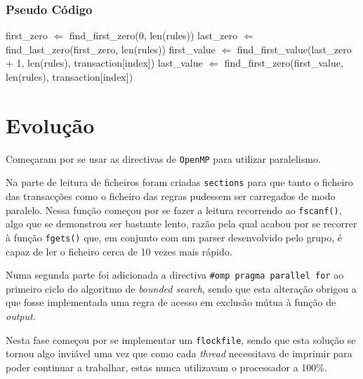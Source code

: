 \documentclass[a4paper]{article}
\begin{document}
\subsubsection{Pseudo Código}
\begin{algorithm}
	\begin{algorithmic}

				\ENDIF

				\STATE first\_zero $\Leftarrow$ find\_first\_zero(0, len(rules))
				\STATE last\_zero $\Leftarrow$ find\_last\_zero(first\_zero, len(rules))
				\STATE first\_value $\Leftarrow$ find\_first\_value(last\_zero + 1, len(rules), transaction[index])
				\STATE last\_value $\Leftarrow$ find\_first\_zero(first\_value, len(rules), transaction[index])

				\ENDIF
				\ENDIF
			\ENDFOR
		\ENDFOR
	\end{algorithmic}
\end{algorithm}
\clearpage

\section{Evolução}
\indent \indent Começaram por se usar as directivas de \texttt{OpenMP} para utilizar paralelismo. 

Na parte de leitura de ficheiros foram criadas \texttt{sections} para que tanto o ficheiro das transacções como o ficheiro das regras pudessem ser carregados de modo paralelo. Nessa função começou por se fazer a leitura recorrendo ao \texttt{fscanf()}, algo que se demonstrou ser bastante lento, razão pela qual acabou por se recorrer à função \texttt{fgets()} que, em conjunto com um parser desenvolvido pelo grupo, é capaz de ler o ficheiro cerca de 10 vezes mais rápido.

Numa segunda parte foi adicionada a directiva \texttt{\#omp pragma parallel for} ao primeiro ciclo do algoritmo de \textit{bounded search}, sendo que esta alteração obrigou a que fosse implementada uma regra de acesso em exclusão mútua à função de \textit{output}.

Nesta fase começou por se implementar um \texttt{flockfile}, sendo que esta solução se tornou algo inviável uma vez que como cada \textit{thread} necessitava de imprimir para poder continuar a trabalhar, estas nunca utilizavam o processador a 100\%.
\end{document}
